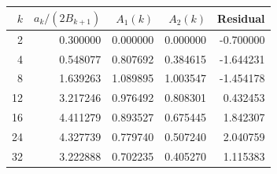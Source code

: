 \begin{tabular}{r r r r r}
\toprule
$k$ & $a_k/(2B_{k+1})$ & $A_1(k)$ & $A_2(k)$ & Residual \\
\midrule
2 & 0.300000 & 0.000000 & 0.000000 & -0.700000 \\
4 & 0.548077 & 0.807692 & 0.384615 & -1.644231 \\
8 & 1.639263 & 1.089895 & 1.003547 & -1.454178 \\
12 & 3.217246 & 0.976492 & 0.808301 & 0.432453 \\
16 & 4.411279 & 0.893527 & 0.675445 & 1.842307 \\
24 & 4.327739 & 0.779740 & 0.507240 & 2.040759 \\
32 & 3.222888 & 0.702235 & 0.405270 & 1.115383 \\
\bottomrule
\end{tabular}
